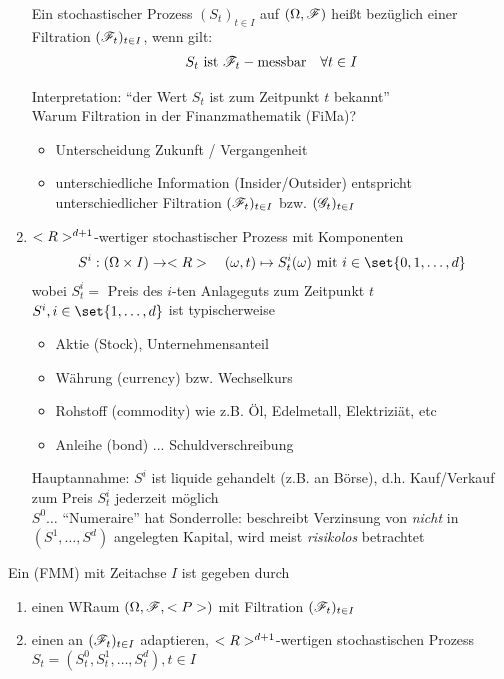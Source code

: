 \begin{enumerate}
\begin{*example}
	Ein stochastischer Prozess $(S_t)_{t\in I}$ auf $(\Omega,\mathscr F)$ heißt  bezüglich einer Filtration $(\mathscr F_t)_{t \in I}$, wenn gilt:
	\begin{align*}
		S_t \text{ ist } \mathscr F_t-\text{messbar} \quad \forall t \in I
	\end{align*}
\end{*example}
Interpretation: ``der Wert $S_t$ ist zum Zeitpunkt $t$ bekannt''\\
Warum Filtration in der Finanzmathematik (FiMa)?
\begin{itemize}
	\item Unterscheidung Zukunft / Vergangenheit
	\item unterschiedliche Information (Insider/Outsider) entspricht unterschiedlicher Filtration $(\mathscr F_t)_{t \in I}$ bzw. $(\mathscr{G}_t)_{t\in I}$
\end{itemize}
	\item {} $<R>^{d+1}$-wertiger stochastischer Prozess mit Komponenten
	\begin{align*}
		S^i: (\O \times I) \to \R\quad (\omega,t) \mapsto S^i_t(\omega) \mit i \in \set{0,1,\dots,d}
	\end{align*} 
	wobei $S^i_t=$ Preis des $i$-ten Anlageguts zum Zeitpunkt $t$\\
	$S^i, i \in \set{1,\dots,d}$ ist typischerweise
	\begin{itemize}
		\item Aktie (Stock), Unternehmensanteil
		\item Währung (currency) bzw. Wechselkurs
		\item Rohstoff (commodity) wie z.B. Öl, Edelmetall, Elektriziät, etc
		\item Anleihe (bond) ... Schuldverschreibung
	\end{itemize}
	Hauptannahme: $S^i$ ist liquide gehandelt (z.B. an Börse), d.h. Kauf/Verkauf zum Preis $S^i_t$ jederzeit möglich\\
	$S^0\dots$ ``Numeraire'' hat Sonderrolle: beschreibt Verzinsung von \emph{nicht} in $(S^1,\dots,S^d)$ angelegten Kapital, wird meist \emph{risikolos} betrachtet
\end{enumerate}
\begin{definition}[Finanzmodell]
	Ein  (FMM) mit Zeitachse $I$ ist gegeben durch
	\begin{enumerate}
		\item einen WRaum $(\Omega, \mathscr F,<P>)$ mit Filtration $(\mathscr F_t)_{t\in I}$
		\item einen an $(\mathscr F_t)_{t \in I}$ adaptieren, $<R>^{d+1}$-wertigen stochastischen Prozess $S_t = (S^0_t, S_t^1, \dots, S^d_t),t \in I$
	\end{enumerate} 
\end{definition}
